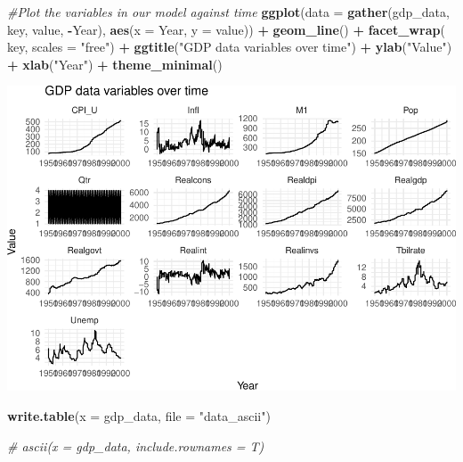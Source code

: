 \documentclass[11pt,]{article}
\newenvironment{Shaded}{\begin{snugshade}}{\end{snugshade}}
\newcommand{\KeywordTok}[1]{\textcolor[rgb]{0.13,0.29,0.53}{\textbf{#1}}}
\newcommand{\DataTypeTok}[1]{\textcolor[rgb]{0.13,0.29,0.53}{#1}}
\newcommand{\StringTok}[1]{\textcolor[rgb]{0.31,0.60,0.02}{#1}}
\newcommand{\CommentTok}[1]{\textcolor[rgb]{0.56,0.35,0.01}{\textit{#1}}}
\newcommand{\OperatorTok}[1]{\textcolor[rgb]{0.81,0.36,0.00}{\textbf{#1}}}
\newcommand{\NormalTok}[1]{#1}
\begin{document}
\begin{Shaded}
\begin{Highlighting}[]
\CommentTok{#Plot the variables in our model against time}
\KeywordTok{ggplot}\NormalTok{(}\DataTypeTok{data =} \KeywordTok{gather}\NormalTok{(gdp_data, key, value, }\OperatorTok{-}\NormalTok{Year), }\KeywordTok{aes}\NormalTok{(}\DataTypeTok{x =}\NormalTok{ Year, }\DataTypeTok{y =}\NormalTok{ value)) }\OperatorTok{+}
\StringTok{  }\KeywordTok{geom_line}\NormalTok{() }\OperatorTok{+}
\StringTok{  }\KeywordTok{facet_wrap}\NormalTok{(}\OperatorTok{~}\StringTok{ }\NormalTok{key, }\DataTypeTok{scales =} \StringTok{"free"}\NormalTok{) }\OperatorTok{+}
\StringTok{  }\KeywordTok{ggtitle}\NormalTok{(}\StringTok{"GDP data variables over time"}\NormalTok{) }\OperatorTok{+}
\StringTok{  }\KeywordTok{ylab}\NormalTok{(}\StringTok{"Value"}\NormalTok{) }\OperatorTok{+}
\StringTok{  }\KeywordTok{xlab}\NormalTok{(}\StringTok{"Year"}\NormalTok{) }\OperatorTok{+}\StringTok{ }\KeywordTok{theme_minimal}\NormalTok{()}
\end{Highlighting}
\end{Shaded}

\includegraphics{ps4_code_files/figure-latex/plot_series-1.pdf}

\begin{Shaded}
\begin{Highlighting}[]
\KeywordTok{write.table}\NormalTok{(}\DataTypeTok{x =}\NormalTok{ gdp_data, }\DataTypeTok{file =} \StringTok{"data_ascii"}\NormalTok{)}

\CommentTok{# ascii(x = gdp_data, include.rownames = T)}
\end{Highlighting}
\end{Shaded}
\end{document}
